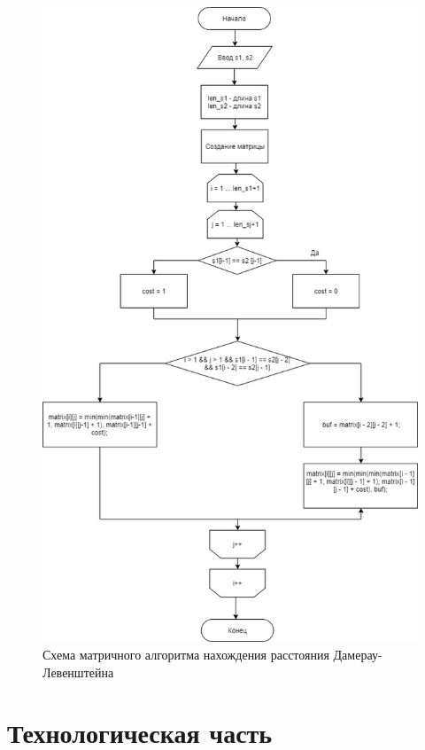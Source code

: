 \documentclass[12pt]{report}
\begin{document}
\begin{figure}[h]
\centering
\includegraphics[width=0.75\linewidth]{MatrixDL.jpg}
\caption{Схема матричного алгоритма нахождения расстояния Дамерау-Левенштейна}
\label{fig:mpr}
\end{figure}


\chapter{Технологическая часть}
\end{document}
